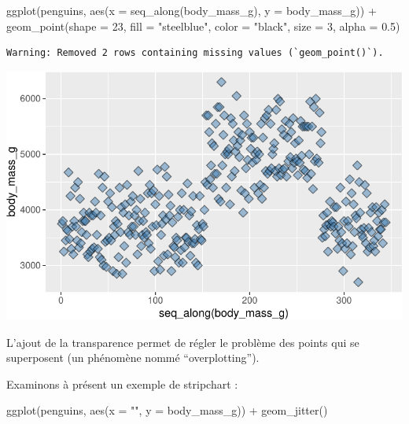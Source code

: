 \documentclass[
  a4paper,
  DIV=11,
  numbers=noendperiod,
  oneside]{scrreprt}
\newenvironment{Shaded}{}{}
\newcommand{\AttributeTok}[1]{\textcolor[rgb]{0.84,0.23,0.29}{#1}}
\newcommand{\DecValTok}[1]{\textcolor[rgb]{0.00,0.36,0.77}{#1}}
\newcommand{\FloatTok}[1]{\textcolor[rgb]{0.00,0.36,0.77}{#1}}
\newcommand{\FunctionTok}[1]{\textcolor[rgb]{0.44,0.26,0.76}{#1}}
\newcommand{\NormalTok}[1]{\textcolor[rgb]{0.14,0.16,0.18}{#1}}
\newcommand{\SpecialCharTok}[1]{\textcolor[rgb]{0.00,0.36,0.77}{#1}}
\newcommand{\StringTok}[1]{\textcolor[rgb]{0.01,0.18,0.38}{#1}}
\begin{document}
\begin{Shaded}
\begin{Highlighting}[]
\FunctionTok{ggplot}\NormalTok{(penguins, }\FunctionTok{aes}\NormalTok{(}\AttributeTok{x =} \FunctionTok{seq\_along}\NormalTok{(body\_mass\_g), }\AttributeTok{y =}\NormalTok{ body\_mass\_g)) }\SpecialCharTok{+}
  \FunctionTok{geom\_point}\NormalTok{(}\AttributeTok{shape =} \DecValTok{23}\NormalTok{, }\AttributeTok{fill =} \StringTok{"steelblue"}\NormalTok{, }\AttributeTok{color =} \StringTok{"black"}\NormalTok{, }
             \AttributeTok{size =} \DecValTok{3}\NormalTok{, }\AttributeTok{alpha =} \FloatTok{0.5}\NormalTok{)}
\end{Highlighting}
\end{Shaded}

\begin{verbatim}
Warning: Removed 2 rows containing missing values (`geom_point()`).
\end{verbatim}

\includegraphics{03-visualization_files/figure-pdf/unnamed-chunk-28-1.pdf}

L'ajout de la transparence permet de régler le problème des points qui
se superposent (un phénomène nommé ``overplotting'').

Examinons à présent un exemple de stripchart :

\begin{Shaded}
\begin{Highlighting}[]
\FunctionTok{ggplot}\NormalTok{(penguins, }\FunctionTok{aes}\NormalTok{(}\AttributeTok{x =} \StringTok{""}\NormalTok{, }\AttributeTok{y =}\NormalTok{ body\_mass\_g)) }\SpecialCharTok{+}
  \FunctionTok{geom\_jitter}\NormalTok{()}
\end{Highlighting}
\end{Shaded}
\end{document}
